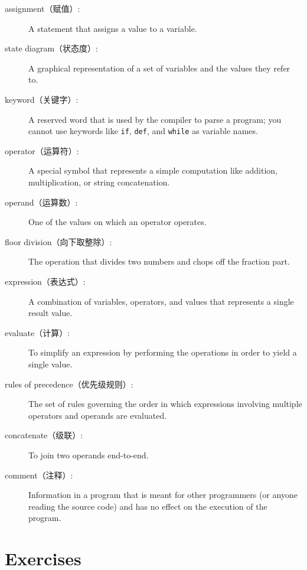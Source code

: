 \documentclass[10pt]{book}
\begin{document}
\begin{CJK}{UTF8}{gbsn}
\begin{description}
\item[assignment（赋值）:]  A statement that assigns a value to a variable.

\item[state diagram（状态度）:]  A graphical representation of a set of variables and the
values they refer to.

\item[keyword（关键字）:]  A reserved word that is used by the compiler to parse a
program; you cannot use keywords like {\tt if}, {\tt  def}, and {\tt while} as
variable names.

\item[operator（运算符）:]  A special symbol that represents a simple computation like
addition, multiplication, or string concatenation.

\item[operand（运算数）:]  One of the values on which an operator operates.

\item[floor division（向下取整除）:] The operation that divides two numbers and chops off
the fraction part.

\item[expression（表达式）:]  A combination of variables, operators, and values that
represents a single result value.

\item[evaluate（计算）:]  To simplify an expression by performing the operations
in order to yield a single value.

\item[rules of precedence（优先级规则）:]  The set of rules governing the order in which
expressions involving multiple operators and operands are evaluated.

\item[concatenate（级联）:]  To join two operands end-to-end.

\item[comment（注释）:]  Information in a program that is meant for other
programmers (or anyone reading the source code) and has no effect on the
execution of the program.

\end{description}


\section{Exercises}


\end{CJK}
\end{document}
